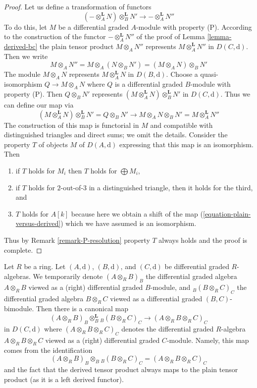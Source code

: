 \documentclass{stacks-project}
\theoremstyle{plain}
\theoremstyle{definition}
\theoremstyle{remark}
\numberwithin{equation}{subsection}
\begin{document}
\begin{proof}
Let us define a transformation of functors
$$
(- \otimes_A^\mathbf{L} N) \otimes_B^\mathbf{L} N'
\longrightarrow
- \otimes_A^\mathbf{L} N''
$$
To do this, let
$M$ be a differential graded $A$-module with property (P).
According to the construction of the functor $- \otimes_A^\mathbf{L} N''$
of the proof of Lemma \ref{lemma-derived-bc} the plain tensor
product $M \otimes_A N''$ represents $M \otimes_A^\mathbf{L} N''$
in $D(C, \text{d})$. Then we write
$$
M \otimes_A N'' =
M \otimes_A (N \otimes_B N') =
(M \otimes_A N) \otimes_B N'
$$
The module $M \otimes_A N$ represents $M \otimes_A^\mathbf{L} N$
in $D(B, \text{d})$. Choose a quasi-isomorphism $Q \to M \otimes_A N$
where $Q$ is a differential graded $B$-module with property (P). Then
$Q \otimes_B N'$ represents
$(M \otimes_A^\mathbf{L} N) \otimes_B^\mathbf{L} N'$ in
$D(C, \text{d})$.
Thus we can define our map via
$$
(M \otimes_A^\mathbf{L} N) \otimes_B^\mathbf{L} N' =
Q \otimes_B N' \to
M \otimes_A N \otimes_B N' =
M \otimes_A^\mathbf{L} N''
$$
The construction of this map is functorial in $M$ and compatible
with distinguished triangles and direct sums; we omit the details.
Consider the property $T$ of objects $M$ of $D(A, \text{d})$ 
expressing that this map is an isomorphism. Then
\begin{enumerate}
\item if $T$ holds for $M_i$ then $T$ holds for $\bigoplus M_i$,
\item if $T$ holds for $2$-out-of-$3$ in a distinguished
triangle, then it holds for the third, and
\item $T$ holds for $A[k]$ because here we obtain a shift
of the map (\ref{equation-plain-versus-derived}) which we
have assumed is an isomorphism.
\end{enumerate}
Thus by Remark \ref{remark-P-resolution} property $T$
always holds and the proof is complete.
\end{proof}

\noindent
Let $R$ be a ring. Let $(A, \text{d})$, $(B, \text{d})$, and
$(C, \text{d})$ be differential graded $R$-algebras.
We temporarily denote $(A \otimes_R B)_B$ the differential
graded algebra $A \otimes_R B$ viewed as a (right) differential
graded $B$-module, and ${}_B(B \otimes_R C)_C$ the differential
graded algebra $B \otimes_R C$ viewed as a differential graded
$(B, C)$-bimodule. Then there is a canonical map
\begin{equation}
\label{equation-plain-versus-derived-algebras}
(A \otimes_R B)_B \otimes_B^\mathbf{L} {}_B(B \otimes_R C)_C
\longrightarrow
(A \otimes_R B \otimes_R C)_C
\end{equation}
in $D(C, \text{d})$ where $(A \otimes_R B \otimes_R C)_C$
denotes the differential
graded $R$-algebra $A \otimes_R B \otimes_R C$ viewed as a
(right) differential graded $C$-module. Namely, this map
comes from the identification
$$
(A \otimes_R B)_B \otimes_B {}_B(B \otimes_R C)_C =
(A \otimes_R B \otimes_R C)_C
$$
and the fact that the derived tensor product always maps to the
plain tensor product (as it is a left derived functor).
\end{document}
